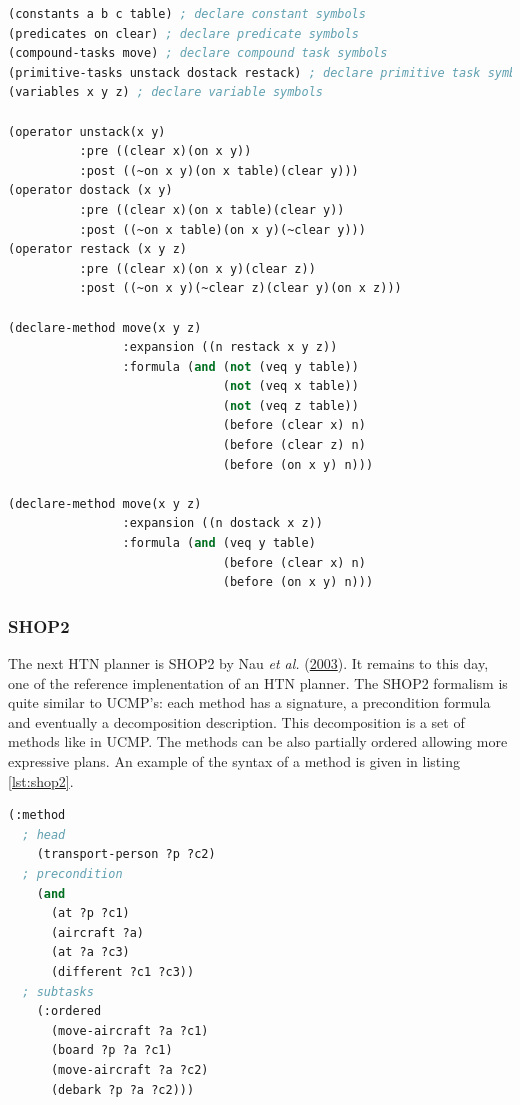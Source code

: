 \documentclass[11pt,a4paper,twoside,openright,titlepage,numbers=noenddot,headinclude,cleardoublepage=empty,openany]{scrreprt}
\theoremstyle{plain}
\theoremstyle{definition}
\theoremstyle{remark}
\begin{document}
\begin{lstlisting}[language=Lisp, caption={Example of the syntax used by UCMP.}, escapechar={$}, label=lst:ucmp]
(constants a b c table) ; declare constant symbols
(predicates on clear) ; declare predicate symbols
(compound-tasks move) ; declare compound task symbols
(primitive-tasks unstack dostack restack) ; declare primitive task symbols
(variables x y z) ; declare variable symbols

(operator unstack(x y)
          :pre ((clear x)(on x y))
          :post ((~on x y)(on x table)(clear y)))
(operator dostack (x y)
          :pre ((clear x)(on x table)(clear y))
          :post ((~on x table)(on x y)(~clear y)))
(operator restack (x y z)
          :pre ((clear x)(on x y)(clear z))
          :post ((~on x y)(~clear z)(clear y)(on x z)))

(declare-method move(x y z)
                :expansion ((n restack x y z))
                :formula (and (not (veq y table))
                              (not (veq x table))
                              (not (veq z table))
                              (before (clear x) n)
                              (before (clear z) n)
                              (before (on x y) n)))

(declare-method move(x y z)
                :expansion ((n dostack x z))
                :formula (and (veq y table)
                              (before (clear x) n)
                              (before (on x y) n)))
\end{lstlisting}

\hypertarget{shop2}{%
\subsubsection{SHOP2}\label{shop2}}

The next HTN planner is SHOP2 by Nau \emph{et al.}
(\protect\hyperlink{ref-nau_shop2_2003}{2003}). It remains to this day,
one of the reference implenentation of an HTN planner. The SHOP2
formalism is quite similar to UCMP's: each method has a signature, a
precondition formula and eventually a decomposition description. This
decomposition is a set of methods like in UCMP. The methods can be also
partially ordered allowing more expressive plans. An example of the
syntax of a method is given in listing \ref{lst:shop2}.

\begin{lstlisting}[language=Lisp, caption={Example of method in the SHOP2 language.}, escapechar={$}, label=lst:shop2]
(:method
  ; head
    (transport-person ?p ?c2)
  ; precondition
    (and
      (at ?p ?c1)
      (aircraft ?a)
      (at ?a ?c3)
      (different ?c1 ?c3))
  ; subtasks
    (:ordered
      (move-aircraft ?a ?c1)
      (board ?p ?a ?c1)
      (move-aircraft ?a ?c2)
      (debark ?p ?a ?c2)))
\end{lstlisting}
\end{document}

